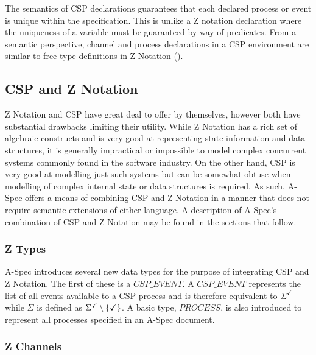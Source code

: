\documentclass[letterpaper,10pt,draft]{book}
\begin{document}
The semantics of CSP declarations guarantees that each declared process or event
is unique within the specification.  This is unlike a Z notation declaration where
the uniqueness of a variable must be guaranteed by way of predicates.  From a semantic
perspective, channel and process declarations in a CSP environment are similar to
free type definitions in Z Notation ().

\subsection{CSP and Z Notation}
   \label{sect:ZProc}

Z Notation and CSP have great deal to offer by themselves, however both have substantial
drawbacks limiting their utility.  While Z Notation has a rich set of algebraic
constructs and is very good at representing state information and data structures,
it is generally impractical or impossible to model complex concurrent systems commonly
found in the software industry.  On the other hand, CSP is very good at modelling
just such systems but can be somewhat obtuse when modelling of complex internal
state or data structures is required.  As such, A-Spec offers a means of combining
CSP and Z Notation in a manner that does not require semantic extensions of either
language.  A description of A-Spec's combination of CSP and Z Notation may be found
in the sections that follow.

\subsubsection{Z Types}
   \label{sect:CSPZTypes}

A-Spec introduces several new data types for the purpose of integrating CSP and
Z Notation.  The first of these is a $CSP\_EVENT$.  A $CSP\_EVENT$ represents the
list of all events available to a CSP process and is therefore equivalent to $\Sigma^{\checkmark}$
while $\Sigma$ is defined as $\Sigma^{\checkmark} \setminus \{ \checkmark \}$.
A basic type, $PROCESS$, is also introduced to represent all processes specified
in an A-Spec document.

\subsubsection{Z Channels}
   \label{sect:CSPZChan}
\end{document}
